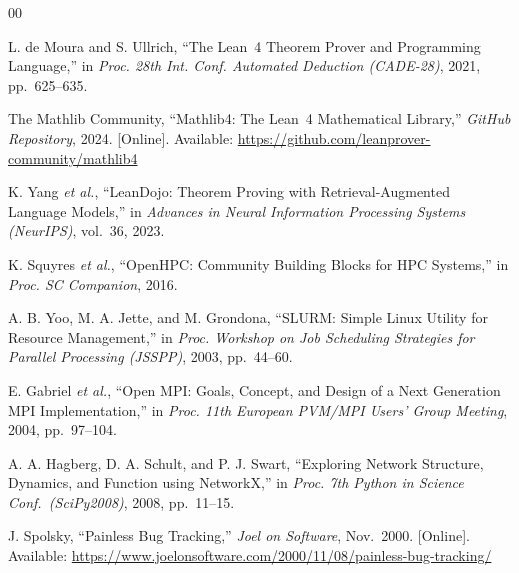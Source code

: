 \documentclass[conference]{IEEEtran}
\begin{document}
\begin{thebibliography}{00}

  L. de Moura and S. Ullrich, ``The Lean~4 Theorem Prover and Programming
  Language,'' in \textit{Proc. 28th Int. Conf. Automated Deduction
  (CADE-28)}, 2021, pp.~625--635.

  The Mathlib Community, ``Mathlib4: The Lean~4 Mathematical Library,''
  \textit{GitHub Repository}, 2024. [Online]. Available:
  \url{https://github.com/leanprover-community/mathlib4}

  K. Yang \textit{et al.}, ``LeanDojo: Theorem Proving with
  Retrieval-Augmented Language Models,'' in \textit{Advances in Neural
  Information Processing Systems (NeurIPS)}, vol.~36, 2023.

  K. Squyres \textit{et al.}, ``OpenHPC: Community Building Blocks for
  HPC Systems,'' in \textit{Proc. SC Companion}, 2016.

  A. B. Yoo, M. A. Jette, and M. Grondona, ``SLURM: Simple Linux Utility
  for Resource Management,'' in \textit{Proc. Workshop on Job Scheduling
  Strategies for Parallel Processing (JSSPP)}, 2003, pp.~44--60.

  E. Gabriel \textit{et al.}, ``Open MPI: Goals, Concept, and Design of a
  Next Generation MPI Implementation,'' in \textit{Proc. 11th European
  PVM/MPI Users' Group Meeting}, 2004, pp.~97--104.

  A. A. Hagberg, D. A. Schult, and P. J. Swart, ``Exploring Network
  Structure, Dynamics, and Function using NetworkX,'' in \textit{Proc.
  7th Python in Science Conf.\ (SciPy2008)}, 2008, pp.~11--15.

  J. Spolsky, ``Painless Bug Tracking,'' \textit{Joel on Software},
  Nov.\ 2000. [Online]. Available:
  \url{https://www.joelonsoftware.com/2000/11/08/painless-bug-tracking/}


\end{thebibliography}
\end{document}
